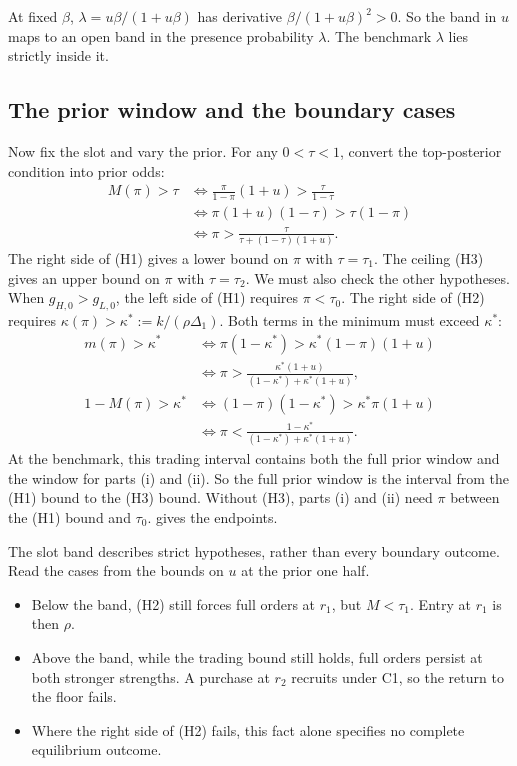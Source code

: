 At fixed $\beta$, $\lambda=u\beta/(1+u\beta)$ has derivative $\beta/(1+u\beta)^2>0$.
So the band in $u$ maps to an open band in the presence probability $\lambda$.
The benchmark $\lambda$ lies strictly inside it.

\subsection{The prior window and the boundary cases}
\label{sec:06_main_result-priors}

Now fix the slot and vary the prior.
For any $0<\tau<1$, convert the top-posterior condition into prior odds:
\begin{align*}
M(\pi)>\tau
&\iff \frac{\pi}{1-\pi}(1+u)>\frac{\tau}{1-\tau}\\
&\iff \pi(1+u)(1-\tau)>\tau(1-\pi)\\
&\iff \pi>\frac{\tau}{\tau+(1-\tau)(1+u)}.
\end{align*}
The right side of (H1) gives a lower bound on $\pi$ with $\tau=\tau_1$.
The ceiling (H3) gives an upper bound on $\pi$ with $\tau=\tau_2$.
We must also check the other hypotheses.
When $g_{H,0}>g_{L,0}$, the left side of (H1) requires $\pi<\tau_0$.
The right side of (H2) requires $\kappa(\pi)>\kappa^*:=k/(\rho\Delta_1)$.
Both terms in the minimum must exceed $\kappa^*$:
\begin{align*}
m(\pi)>\kappa^*
&\iff \pi(1-\kappa^*)>\kappa^*(1-\pi)(1+u)\\
&\iff\pi>\frac{\kappa^*(1+u)}{(1-\kappa^*)+\kappa^*(1+u)},\\
1-M(\pi)>\kappa^*
&\iff(1-\pi)(1-\kappa^*)>\kappa^*\pi(1+u)\\
&\iff\pi<\frac{1-\kappa^*}{(1-\kappa^*)+\kappa^*(1+u)}.
\end{align*}
At the benchmark, this trading interval contains both the full prior window and the window for parts (i) and (ii).
So the full prior window is the interval from the (H1) bound to the (H3) bound.
Without (H3), parts (i) and (ii) need $\pi$ between the (H1) bound and $\tau_0$.
 gives the endpoints.

The slot band describes strict hypotheses, rather than every boundary outcome.
Read the cases from the bounds on $u$ at the prior one half.
\begin{itemize}
\item Below the band, (H2) still forces full orders at $r_1$, but $M<\tau_1$.
Entry at $r_1$ is then $\rho$.
\item Above the band, while the trading bound still holds, full orders persist at both stronger strengths.
A purchase at $r_2$ recruits under C1, so the return to the floor fails.
\item Where the right side of (H2) fails, this fact alone specifies no complete equilibrium outcome.
\end{itemize}

